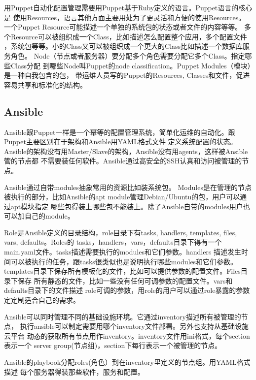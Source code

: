 用Puppet自动化配置管理需要用Puppet基于Ruby定义的语言。Puppet语言的核心是
使用Resources，语言其他方面主要用处为了更灵活和方便的使用Resources。
一个Puppet Resource可能描述一个单独的系统包的状态或者文件的内容等等。
多个Resource可以被组织成一个Class，比如描述怎么配置整个应用，多个配置文件
，系统包等等。小的Class又可以被组织成一个更大的Class比如描述一个数据库服务角色。
Node（节点或者服务器）要分配多个角色需要分配它多个Class。指定哪些Class分配
到哪些Node叫Puppet的node classification。Puppet Modules（模块）是一种自我包含的包，
带运维人员写的Puppet的Resources, Classes和文件，促进容易共享和标准化的结构。

\subsection{Ansible}
\label{subsubsec:ansible}
Ansible跟Puppet一样是一个幂等的配置管理系统，简单化运维的自动化。跟Puppet主要区别在于架构和Ansible用YAML格式文件
定义系统配置的状态。Ansible的架构没有用Master/Slave的架构，Ansible没有用agents，这样被Ansible管的节点都
不需要装任何软件。Ansible通过高安全的SSH认真和访问被管理的节点。

Ansible通过自带modules抽象常用的资源比如装系统包。
Modules是在管理的节点被执行的部分，比如Ansible的apt module管理Debian/Ubuntu的包，用户可以通过apt模块指定
哪些包得装上哪些包不能装上。除了Ansible自带的modules用户也可以加自己的module。

Role是Ansible定义的目录结构，role目录下有tasks, handlers, templates, files, vars, defaults。Roles的
tasks，handlers，vars，defaults目录下得有一个main.yaml文件。tasks描述需要执行的modules和它们参数。handlers
描述发生时间可以被执行的任务，跟tasks很类似也是说明执行哪些modules和它们参数。
templates目录下保存所有模板化的文件，比如可以提供参数的配置文件。Files目录下保存
所有静态的文件，比如一些没有任何可调参数的配置文件。vars和defaults目录下的文件描述
role可调的参数，用role的用户可以通过role暴露的参数定定制适合自己的需求。

Ansible可以同时管理不同的基础设施环境。它通过inventory描述所有被管理的节点，
执行ansible可以制定需要用哪个inventory文件部署。另外也支持从基础设施云平台
动态的获取所有节点用作inventory。inventory文件用ini格式，每个section表示一个
server group(节点组)，section下每行表示一个被管理的节点。

Ansible的playbook分配roles(角色）到在inventory里定义的节点组。用YAML格式描述
每个服务器得装那些软件，服务和配置。




